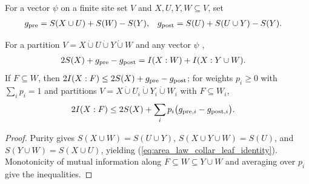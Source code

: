 \begin{definition}
    \label{def:area_law_collar_leaf_quantities}
    \leanok
    For a vector $\psi$ on a finite site set $V$ and $X,U,Y,W\subseteq V$, set
    \begin{align}
        g_{\rm pre}  & =S(X\cup U)+S(W)-S(Y),       &
        g_{\rm post} & =S(U)+S(U\cup Y)-S(Y).\notag
    \end{align}
\end{definition}

\begin{lemma}
    \label{thm:area_law_collar_leaf_identity}
    \leanok
    For a partition $V=X\mathbin{\dot\cup}U\mathbin{\dot\cup}Y\mathbin{\dot\cup}W$
    and any vector $\psi$ \cite[proof of Proposition~9.6]{OpenAI2026AreaLaw},
    \begin{align}
        2S(X)+g_{\rm pre}-g_{\rm post} & =I(X:W)+I(X:Y\cup W).
        \label{eq:area_law_collar_leaf_identity}
    \end{align}
    If $F\subseteq W$, then $2I(X:F)\le2S(X)+g_{\rm pre}-g_{\rm post}$; for
    weights $p_i\ge0$ with $\sum_ip_i=1$ and partitions
    $V=X\mathbin{\dot\cup}U_i\mathbin{\dot\cup}Y_i\mathbin{\dot\cup}W_i$ with
    $F\subseteq W_i$,
    \begin{align}
        2I(X:F) & \le2S(X)+\sum_ip_i\bigl(g_{{\rm pre},i}-g_{{\rm post},i}\bigr).\notag
    \end{align}
\end{lemma}
\begin{proof}
    \leanok
    Purity gives $S(X\cup W)=S(U\cup Y)$, $S(X\cup Y\cup W)=S(U)$, and
    $S(Y\cup W)=S(X\cup U)$, yielding (\ref{eq:area_law_collar_leaf_identity}).
    Monotonicity of mutual information along $F\subseteq W\subseteq Y\cup W$ and
    averaging over $p_i$ give the inequalities.
\end{proof}

